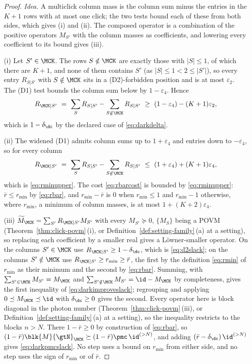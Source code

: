 \begin{proof}
\emph{Idea.} A multiclick column mass is the column sum minus the entries in
the $K+1$ rows with at most one click; the two tests bound each of these from
both sides, which gives (i) and (ii). The composed operator is a combination of
the positive operators $M_{S'}$ with the column masses as coefficients, and
lowering every coefficient to its bound gives (iii).

(i) Let $S'\in\MCK$. The rows $S\notin\MCK$ are exactly those with $|S|\le1$,
of which there are $K+1$, and none of them contains $S'$ (as
$|S|\le1<2\le|S'|$), so every entry $R_{S|S'}$ with $S\notin\MCK$ sits in a
(D2)-forbidden position and is at most $\varepsilon_2$. The (D1) test bounds
the column sum below by $1-\varepsilon_4$. Hence
\begin{equation*}
  R_{\MCK|S'}\ =\ \sum_{S}R_{S|S'}-\sum_{S\notin\MCK}R_{S|S'}
  \ \ge\ (1-\varepsilon_4)-(K+1)\varepsilon_2 ,
\end{equation*}
which is $1-\delta_{\dc}$ by the declared case of \eqref{eq:darkdelta}.

(ii) The widened (D1) admits column sums up to $1+\varepsilon_4$ and entries
down to $-\varepsilon_4$, so for every column
\begin{equation*}
  R_{\MCK|S'}\ =\ \sum_SR_{S|S'}-\sum_{S\notin\MCK}R_{S|S'}
  \ \le\ (1+\varepsilon_4)+(K+1)\varepsilon_4 ,
\end{equation*}
which is \eqref{eq:rminupper}. The cost \eqref{eq:rbarcost} is bounded by
\eqref{eq:rminupper}: $\bar r\le r_{\min}$ by \eqref{eq:rbar}, and
$r_{\min}-\bar r$ is $0$ when $r_{\min}\le1$ and $r_{\min}-1$ otherwise, where
$r_{\min}$, a minimum of column masses, is at most $1+(K+2)\varepsilon_4$.

(iii) $\widetilde M_{\MCK}=\sum_{S'}R_{\MCK|S'}M_{S'}$ with every
$M_{S'}\succeq0$, $\{M_S\}$ being a POVM (Theorem~\ref{thm:click-povm}\,(i),
or Definition~\ref{def:setting-family}\,(a) at a setting), so replacing each coefficient by
a smaller real gives a L\"owner-smaller operator. On the columns $S'\in\MCK$
use $R_{\MCK|S'}\ge1-\delta_{\dc}$, which is \eqref{eq:d2slack}; on the columns
$S'\notin\MCK$ use $R_{\MCK|S'}\ge r_{\min}\ge\bar r$, the first by the
definition \eqref{eq:rmin} of $r_{\min}$ as their minimum and the second by
\eqref{eq:rbar}. Summing, with $\sum_{S'\in\MCK}M_{S'}=M_{\MCK}$ and
$\sum_{S'\notin\MCK}M_{S'}=\id-M_{\MCK}$ by completeness, gives
the first inequality of \eqref{eq:darkimproveslack}; regrouping and applying
$0\preceq M_{\MCK}\preceq\id$ with $\delta_{\dc}\ge0$ gives the second. Every
operator here is block diagonal in the photon number
(Theorem~\ref{thm:click-povm}\,(iii), or
Definition~\ref{def:setting-family}\,(a) at a setting), so the inequality
restricts to the blocks $n>N$. There $1-\bar r\ge0$ by construction of
\eqref{eq:rbar}, so
$(1-\bar r)\blk{M}{\gtN}_{\MCK}\succeq(1-\bar r)\pmc\,\id^{(>N)}$, and adding
$(\bar r-\delta_{\dc})\,\id^{(>N)}$ gives \eqref{eq:darkpmcslack}. No step uses
a bound on $r_{\min}$ from either side, and no step uses the sign of $r_{\min}$
or of $\bar r$.
\end{proof}
